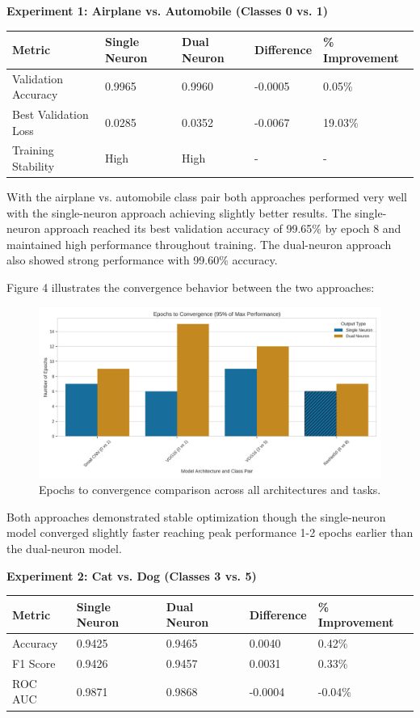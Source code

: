 \documentclass[11pt]{article}
\begin{document}
\textbf{Experiment 1: Airplane vs. Automobile (Classes 0 vs. 1)}

\begin{tabular}{lllll}
\hline
Metric & Single Neuron & Dual Neuron & Difference & \% Improvement \\
\hline
Validation Accuracy & 0.9965 & 0.9960 & -0.0005 & 0.05\% \\
Best Validation Loss & 0.0285 & 0.0352 & -0.0067 & 19.03\% \\
Training Stability & High & High & - & - \\
\hline
\end{tabular}

With the airplane vs. automobile class pair both approaches performed very well with the single-neuron approach achieving slightly better results. The single-neuron approach reached its best validation accuracy of 99.65\% by epoch 8 and maintained high performance throughout training. The dual-neuron approach also showed strong performance with 99.60\% accuracy.

Figure 4 illustrates the convergence behavior between the two approaches:

\begin{figure}[htbp]
\centering
\includegraphics[width=\textwidth]{figures/convergence_rate_comparison.png}
\caption{Epochs to convergence comparison across all architectures and tasks.}
\end{figure}

Both approaches demonstrated stable optimization though the single-neuron model converged slightly faster reaching peak performance 1-2 epochs earlier than the dual-neuron model.

\textbf{Experiment 2: Cat vs. Dog (Classes 3 vs. 5)}

\begin{tabular}{lllll}
\hline
Metric & Single Neuron & Dual Neuron & Difference & \% Improvement \\
\hline
Accuracy & 0.9425 & 0.9465 & 0.0040 & 0.42\% \\
F1 Score & 0.9426 & 0.9457 & 0.0031 & 0.33\% \\
ROC AUC & 0.9871 & 0.9868 & -0.0004 & -0.04\% \\
\hline
\end{tabular}
\end{document}
